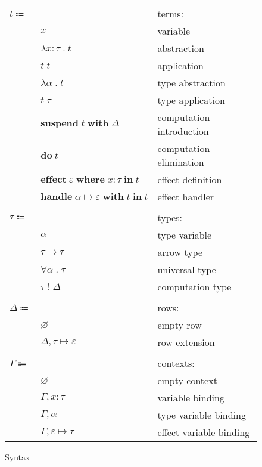 \documentclass[12pt]{article}
\newcommand\anno[2]{#1 : #2}
\newcommand\xVar{\varepsilon}
\newcommand\tToX[2]{#1 \mapsto #2}
\newcommand\row{\Delta}
\newcommand\rEmpty{\varnothing}
\newcommand\rExtend[3]{#1, \tToX{#2}{#3}}
\newcommand\term{t}
\newcommand\eVar{x}
\newcommand\eAbs[3]{\lambda \anno{#1}{#2} \; . \; #3}
\newcommand\eApp[2]{#1 \; #2}
\newcommand\eTAbs[2]{\lambda #1 \; . \; #2}
\newcommand\eTApp[2]{#1 \; #2}
\newcommand\eSuspend[2]{\textbf{suspend} \; #1 \; \textbf{with} \; #2}
\newcommand\eDo[1]{\textbf{do} \; #1}
\newcommand\eEffect[4]{\textbf{effect} \; #1 \; \textbf{where} \; \anno{#2}{#3} \; \textbf{in} \; #4}
\newcommand\eHandle[4]{\textbf{handle} \; \tToX{#1}{#2} \; \textbf{with} \; #3 \; \textbf{in} \; #4}
\newcommand\type{\tau}
\newcommand\tVar{\alpha}
\newcommand\tArrow[2]{#1 \rightarrow #2}
\newcommand\tForAll[2]{\forall #1 \; . \; #2}
\newcommand\tComputation[2]{#1 \; ! \; #2}
\newcommand\context{\Gamma}
\newcommand\cEmpty{\varnothing}
\newcommand\cEExtend[3]{#1, \anno{#2}{#3}}
\newcommand\cTExtend[2]{#1, #2}
\newcommand\cXExtend[3]{#1, #2 \mapsto #3}
\begin{document}
      \begin{figure}[H]
        \begin{mdframed}[backgroundcolor=none]
          \begin{center}
            \begin{tabular}{l l l}
              $\term \Coloneqq$ & & terms: \\
              & $\eVar$ & variable \\
              & $\eAbs{\eVar}{\type}{\term}$ & abstraction \\
              & $\eApp{\term}{\term}$ & application \\
              & $\eTAbs{\tVar}{\term}$ & type abstraction \\
              & $\eTApp{\term}{\type}$ & type application \\
              & $\eSuspend{\term}{\row}$ & computation introduction \\
              & $\eDo{\term}$ & computation elimination \\
              & $\eEffect{\xVar}{\eVar}{\type}{\term}$ & effect definition \\
              & $\eHandle{\tVar}{\xVar}{\term}{\term}$ & effect handler \\
              \\
              $\type \Coloneqq$ & & types: \\
              & $\tVar$ & type variable \\
              & $\tArrow{\type}{\type}$ & arrow type \\
              & $\tForAll{\tVar}{\type}$ & universal type \\
              & $\tComputation{\type}{\row}$ & computation type \\
              \\
              $\row \Coloneqq$ & & rows: \\
              & $\rEmpty$ & empty row \\
              & $\rExtend{\row}{\type}{\xVar}$ & row extension \\
              \\
              $\context \Coloneqq$ & & contexts: \\
              & $\cEmpty$ & empty context \\
              & $\cEExtend{\context}{\eVar}{\type}$ & variable binding \\
              & $\cTExtend{\context}{\tVar}$ & type variable binding \\
              & $\cXExtend{\context}{\xVar}{\type}$ & effect variable binding \\
            \end{tabular}
          \end{center}

          \caption{Syntax}\label{fig:syntax}
        \end{mdframed}
      \end{figure}
\end{document}
